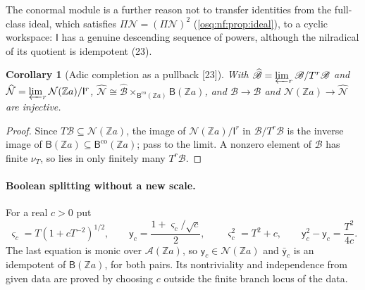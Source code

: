\documentclass[11pt,letterpaper]{article}
\numberwithin{equation}{section}
\newtheorem{corollary}[corollary]{Corollary}
\theoremstyle{definition}
\theoremstyle{remark}
\theoremstyle{plain}
\newcommand{\Z}{\mathbb Z}
\newcommand{\A}{\mathcal A}          %
\newcommand{\NN}{\mathcal N}         %
\newcommand{\src}[1]{\textup{\textsf{[#1]}}}
\begin{document}
The conormal module is a further reason not to transfer identities from the full-class ideal, which satisfies $\Pi\NN=(\Pi\NN)^2$
(\cref{osq:nf:prop:ideal}), to a cyclic workspace: $\mathsf I$ has a genuine descending sequence of powers, although the nilradical of its quotient is
idempotent (23).

\begin{corollary}[Adic completion as a pullback \src{23}]\label{osq:rm:cor:completion}
With $\widehat{\mathscr B}=\varprojlim_r\mathscr B/T^r\mathscr B$ and $\widehat{\NN}=\varprojlim_r\NN(\Z a)/\mathsf I^r$,
$\widehat{\NN}\cong\widehat{\mathscr B}\times_{\mathsf B^{\mathrm{co}}(\Z a)}\mathsf B(\Z a)$, and $\mathscr B\to\widehat{\mathscr B}$ and $\NN(\Z a)\to\widehat{\NN}$ are injective.
\end{corollary}
\begin{proof}
Since $T\mathscr B\subseteq\NN(\Z a)$, the image of $\NN(\Z a)/\mathsf I^r$ in $\mathscr B/T^r\mathscr B$ is the inverse image of $\mathsf B(\Z a)\subseteq\mathsf B^{\mathrm{co}}(\Z a)$;
pass to the limit. A nonzero element of $\mathscr B$ has finite $\nu_T$, so lies in only finitely many $T^r\mathscr B$.
\end{proof}

\paragraph{Boolean splitting without a new scale.} For a real $c>0$ put
\begin{equation}\label{osq:rm:eq:splitter}
 \varsigma_c=T(1+cT^{-2})^{1/2},\qquad \mathsf y_c=\frac{1+\varsigma_c/\sqrt c}2,\qquad \varsigma_c^2=T^2+c,\qquad \mathsf y_c^2-\mathsf y_c=\frac{T^2}{4c}.
\end{equation}
The last equation is monic over $\A(\Z a)$, so $\mathsf y_c\in\NN(\Z a)$ and $\bar{\mathsf y}_c$ is an idempotent of $\mathsf B(\Z a)$, for both pairs. Its
nontriviality and independence from given data are proved by choosing $c$ outside the finite branch locus of the data.
\end{document}
